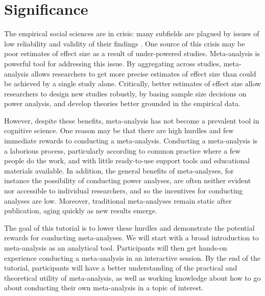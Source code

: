 \documentclass[10pt,letterpaper]{article}
\begin{document}
\section{Significance}

The empirical social sciences are in crisis: many subfields are plagued by issues of low reliability and validity of their findings \cite{ioannidis2005most,open2013reproducibility,open2015estimating}. One source of this crisis may be poor estimates of effect size as a result of under-powered studies. Meta-analysis is powerful tool for addressing this issue. By aggregating across studies, meta-analysis allows researchers to get more precise estimates of effect size than could be achieved by a single study alone. Critically,  better  estimates of effect size allow researchers to design new studies robustly,  by basing sample size decisions on power analysis, and develop theories better grounded in the empirical data.

However, despite these benefits, meta-analysis has not become a prevalent tool in cognitive science. One reason may be that there are high hurdles and few immediate rewards to conducting a meta-analysis. Conducting a meta-analysis is a laborious process, particularly according to common practice where a few people do the work, and with little ready-to-use support tools and educational materials available. In addition, the general benefits of meta-analyses, for instance the possibility of conducting power analyses, are often neither evident nor accessible to individual researchers, and so the incentives for conducting analyses are low. Moreover, traditional meta-analyses remain static after publication, aging quickly as new results emerge. 

The goal of this tutorial is to lower these hurdles and demonstrate the potential rewards for conducting meta-analyses. We will start with a broad introduction to meta-analysis as an analytical tool. Participants will then get hands-on experience conducting a meta-analysis in an interactive session. By the end of the tutorial,  participants  will have a better understanding of the practical and theoretical utility of meta-analysis, as well as working knowledge about how to go about conducting their own meta-analysis in a topic of interest.
\end{document}
